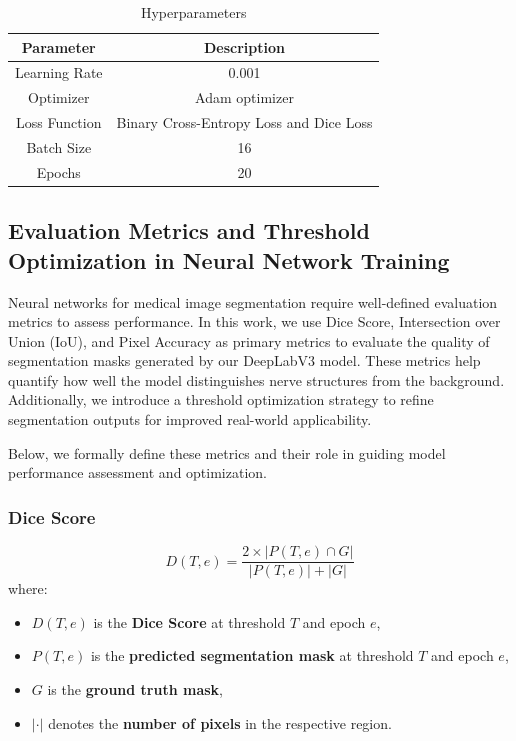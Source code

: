 \documentclass{article}
\begin{document}
\begin{table}[h]
    \centering
    \begin{tabular}{|c|c|}
        \hline
        Parameter & Description \\ \hline
        Learning Rate & 0.001 \\ \hline
        Optimizer & Adam optimizer \\ \hline
        Loss Function & Binary Cross-Entropy Loss and Dice Loss \\ \hline
        Batch Size & 16 \\ \hline
        Epochs & 20 \\ \hline
    \end{tabular}
    \caption{Hyperparameters}
    \label{Hyperparameters}
\end{table}

\subsection{Evaluation Metrics and Threshold Optimization in Neural Network Training}

Neural networks for medical image segmentation require well-defined evaluation metrics to assess performance. In this work, we use Dice Score, Intersection over Union (IoU), and Pixel Accuracy as primary metrics to evaluate the quality of segmentation masks generated by our DeepLabV3 model. These metrics help quantify how well the model distinguishes nerve structures from the background. Additionally, we introduce a threshold optimization strategy to refine segmentation outputs for improved real-world applicability.

Below, we formally define these metrics and their role in guiding model performance assessment and optimization.

\subsubsection{Dice Score}
\begin{equation}
D(T, e) = \frac{2 \times |P(T, e) \cap G|}{|P(T, e)| + |G|}
\end{equation}
where:
\begin{itemize}
    \item \( D(T, e) \) is the \textbf{Dice Score} at threshold \( T \) and epoch \( e \),
    \item \( P(T, e) \) is the \textbf{predicted segmentation mask} at threshold \( T \) and epoch \( e \),
    \item \( G \) is the \textbf{ground truth mask},
    \item \( |\cdot| \) denotes the \textbf{number of pixels} in the respective region.
\end{itemize}
\end{document}
